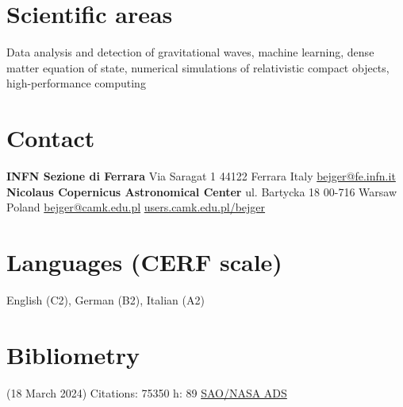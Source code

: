 \documentclass[]{friggeri-cv} %
\begin{document}


\begin{aside} %
\section{Scientific areas} 
Data analysis and detection of gravitational waves, machine learning, dense matter equation of state, numerical simulations of relativistic compact objects, high-performance computing 
~
\section{Contact}
{\bf INFN Sezione di Ferrara}
Via Saragat 1
44122 Ferrara
Italy
\href{mailto:bejger@fe.infn.it}{bejger@fe.infn.it}
~
{\bf Nicolaus Copernicus Astronomical Center} 
ul. Bartycka 18
00-716 Warsaw 
Poland
\href{mailto:bejger@camk.edu.pl}{bejger@camk.edu.pl}
\href{http://users.camk.edu.pl/bejger}{users.camk.edu.pl/bejger}
~
\section{Languages {\small (CERF scale)}}
English (C2), German (B2), Italian (A2)
\section{Bibliometry} 
{\small (18 March 2024)}
Citations: 75350
h: 89 
\href{https://ui.adsabs.harvard.edu/search/q=author\%3A\%22Bejger\%2C\%20M.\%22&sort=date\%20desc\%2C\%20bibcode\%20desc&p_=0}{SAO/NASA ADS}
\end{aside}
\end{document}
